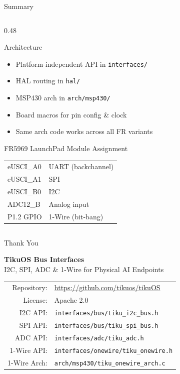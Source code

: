 \documentclass[aspectratio=169, 10pt]{beamer}
\begin{document}
\begin{frame}{Summary}
\begin{columns}[T]
\begin{column}{0.48\textwidth}
\begin{block}{Architecture}
\begin{itemize}
  \item Platform-independent API in \texttt{interfaces/}
  \item HAL routing in \texttt{hal/}
  \item MSP430 arch in \texttt{arch/msp430/}
  \item Board macros for pin config \& clock
  \item Same arch code works across all FR variants
\end{itemize}
\end{block}

\begin{block}{FR5969 LaunchPad Module Assignment}
\begin{tabular}{@{}ll@{}}
eUSCI\_A0 & UART (backchannel) \\
eUSCI\_A1 & SPI \\
eUSCI\_B0 & I2C \\
ADC12\_B  & Analog input \\
P1.2 GPIO & 1-Wire (bit-bang) \\
\end{tabular}
\end{block}
\end{column}
\end{columns}
\end{frame}

\begin{frame}{Thank You}
\begin{center}
\Large\textbf{TikuOS Bus Interfaces}\\[0.5em]
\normalsize I2C, SPI, ADC \& 1-Wire for Physical AI Endpoints\\[1.5em]

\begin{tabular}{rl}
  Repository:  & \url{https://github.com/tikuos/tikuOS} \\
  License:     & Apache 2.0 \\
  I2C API:     & \texttt{interfaces/bus/tiku\_i2c\_bus.h} \\
  SPI API:     & \texttt{interfaces/bus/tiku\_spi\_bus.h} \\
  ADC API:     & \texttt{interfaces/adc/tiku\_adc.h} \\
  1-Wire API:  & \texttt{interfaces/onewire/tiku\_onewire.h} \\
  1-Wire Arch: & \texttt{arch/msp430/tiku\_onewire\_arch.c} \\
\end{tabular}
\end{center}
\end{frame}
\end{document}
